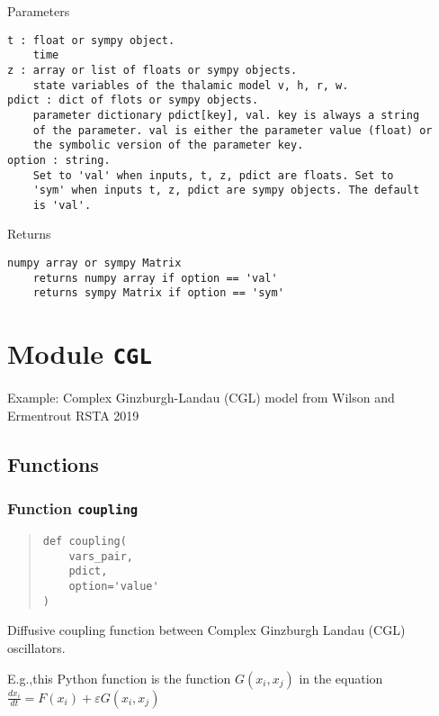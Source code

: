 \documentclass[
  english,
  a4paper,
  oneside]{article}
\begin{document}
Parameters

\begin{verbatim}
t : float or sympy object.
    time
z : array or list of floats or sympy objects.
    state variables of the thalamic model v, h, r, w.
pdict : dict of flots or sympy objects.
    parameter dictionary pdict[key], val. key is always a string
    of the parameter. val is either the parameter value (float) or 
    the symbolic version of the parameter key.
option : string.
    Set to 'val' when inputs, t, z, pdict are floats. Set to
    'sym' when inputs t, z, pdict are sympy objects. The default
    is 'val'.
\end{verbatim}

Returns

\begin{verbatim}
numpy array or sympy Matrix
    returns numpy array if option == 'val'
    returns sympy Matrix if option == 'sym'
\end{verbatim}

\hypertarget{CGL}{%
\section{\texorpdfstring{Module \texttt{CGL}}{Module CGL}}\label{CGL}}

Example: Complex Ginzburgh-Landau (CGL) model from Wilson and Ermentrout
RSTA 2019

\hypertarget{functions-2}{%
\subsection{Functions}\label{functions-2}}

\hypertarget{CGL.coupling}{%
\subsubsection{\texorpdfstring{Function
\texttt{coupling}}{Function coupling}}\label{CGL.coupling}}

\begin{quote}
\begin{verbatim}
def coupling(
    vars_pair,
    pdict,
    option='value'
)
\end{verbatim}
\end{quote}

Diffusive coupling function between Complex Ginzburgh Landau (CGL)
oscillators.

E.g.,this Python function is the function \(G(x_i,x_j)\) in the equation
\(\frac{dx_i}{dt} = F(x_i) + \varepsilon G(x_i,x_j)\)
\end{document}
